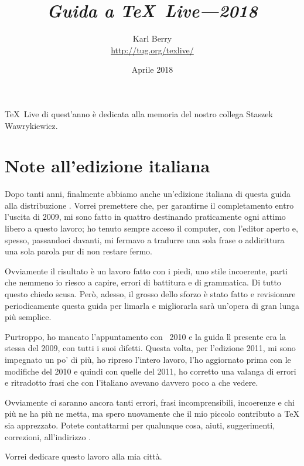 \documentclass{article}
\title{%
  {\huge \textit{Guida a \TeX\ Live---2018}}
}
\author{Karl Berry\\[3mm]
        \url{http://tug.org/texlive/}
       }
\date{Aprile 2018}
\begin{document}
\maketitle

\begin{center}
\TeX\ Live di quest'anno è dedicata alla memoria del nostro collega
Staszek Wawrykiewicz.
\end{center}

\begin{multicols}{2}
\tableofcontents
\end{multicols}


\section*{Note all'edizione italiana}

Dopo tanti anni, finalmente abbiamo anche un'edizione italiana di questa
guida alla distribuzione \TL. Vorrei premettere che, per garantirne il
completamento entro l'uscita di \TL{} 2009, mi sono fatto in quattro
destinando praticamente ogni attimo libero a questo lavoro; ho tenuto
sempre acceso il computer, con l'editor aperto e, spesso, passandoci
davanti, mi fermavo a tradurre una sola frase o addirittura una sola
parola pur di non restare fermo.

Ovviamente il risultato è un lavoro fatto con i piedi, uno stile
incoerente, parti che nemmeno io riesco a capire, errori di battitura e di
grammatica. Di tutto questo chiedo scusa. Però, adesso, il grosso dello
sforzo è stato fatto e revisionare periodicamente questa guida per limarla
e migliorarla sarà un'opera di gran lunga più semplice.

Purtroppo, ho mancato l'appuntamento con \TL\ 2010 e la guida lì presente
era la stessa del 2009, con tutti i suoi difetti. Questa volta, per
l'edizione 2011, mi sono impegnato un po' di più, ho ripreso l'intero
lavoro, l'ho aggiornato prima con le modifiche del 2010 e quindi con quelle
del 2011, ho corretto una valanga di errori e ritradotto frasi che con
l'italiano avevano davvero poco a che vedere.

Ovviamente ci saranno ancora tanti errori, frasi incomprensibili, incoerenze
e chi più ne ha più ne metta, ma spero nuovamente che il mio piccolo
contributo a \TeX{} sia apprezzato. Potete contattarmi per qualunque cosa,
aiuti, suggerimenti, correzioni, all'indirizzo
.

Vorrei dedicare questo lavoro alla mia città.
\end{document}
